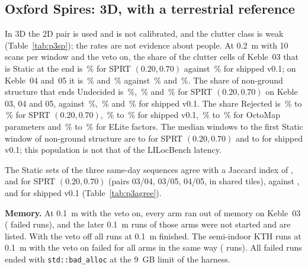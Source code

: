 \subsection{Oxford Spires: 3D, with a terrestrial reference}\label{subsec:p3spires}



In 3D the 2D pair is used and is not calibrated, and the clutter class is weak (Table~\ref{tab:p3sp}); the rates are not evidence about people. At 0.2~m with 10 scans per window and the veto on, the share of the \PtSpClutterN{} clutter cells of Keble~03 that is Static at the end is \PtSpAEndSprt\,\% for SPRT $(0.20,0.70)$ against \PtSpAEndShipped\,\% for shipped v0.1; on Keble~04 and~05 it is \PtSpBEndSprt\,\% and \PtSpCEndSprt\,\% against \PtSpBEndShipped\,\% and \PtSpCEndShipped\,\%. The share of non-ground structure that ends Undecided is \PtSpAUndSprt\,\%, \PtSpBUndSprt\,\% and \PtSpCUndSprt\,\% for SPRT $(0.20,0.70)$ on Keble 03, 04 and 05, against \PtSpAUndShipped\,\%, \PtSpBUndShipped\,\% and \PtSpCUndShipped\,\% for shipped v0.1. The share Rejected is \PtSpSprtRejLo\,\% to \PtSpSprtRejHi\,\% for SPRT $(0.20,0.70)$, \PtSpShipRejLo\,\% to \PtSpShipRejHi\,\% for shipped v0.1, \PtSpOtherRejLo\,\% to \PtSpOtherRejHi\,\% for OctoMap parameters and \PtSpEliteRejLo\,\% to \PtSpEliteRejHi\,\% for ELite factors. The median windows to the first Static window of non-ground structure are \PtSpSprtMedLo{} to \PtSpSprtMedHi{} for SPRT $(0.20,0.70)$ and \PtSpShipMedLo{} to \PtSpShipMedHi{} for shipped v0.1; this population is not that of the LILocBench latency.



The Static sets of the three same-day sequences agree with a Jaccard index of \PtSpAgAutSprSprt, \PtSpAgAutSumSprt{} and \PtSpAgSprSumSprt{} for SPRT $(0.20,0.70)$ (pairs 03/04, 03/05, 04/05, in \PtSpAgTiles{} shared tiles), against \PtSpAgAutSprShipped, \PtSpAgAutSumShipped{} and \PtSpAgSprSumShipped{} for shipped v0.1 (Table~\ref{tab:p3agree}).

\noindent\textbf{Memory.} At 0.1~m with the veto on, every arm ran out of memory on Keble~03 (\PtFailSpires{} failed runs), and the later 0.1~m runs of those arms were not started and are listed. With the veto off all \PtOffRuns{} runs at 0.1~m finished. The semi-indoor KTH runs at 0.1~m with the veto on failed for all arms in the same way (\PtFailKth{} runs). All \PtFailAll{} failed runs ended with \texttt{std::bad\_alloc} at the 9~GB limit of the harness.


